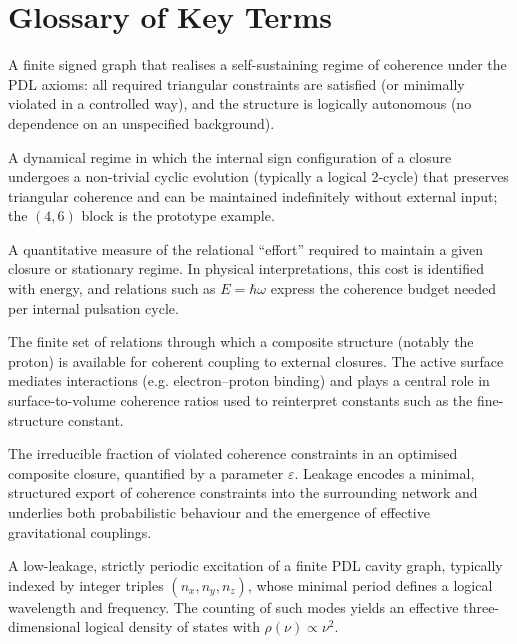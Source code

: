 \documentclass{article}
\begin{document}
\section{Glossary of Key Terms}
\label{app:key_glossary}

\begin{description}[style=nextline,leftmargin=1.5cm]

\item[Closure]
A finite signed graph that realises a self-sustaining regime of coherence under the PDL axioms: all required triangular constraints are satisfied (or minimally violated in a controlled way), and the structure is logically autonomous (no dependence on an unspecified background). 

\item[Logical stationary regime]
A dynamical regime in which the internal sign configuration of a closure undergoes a non-trivial cyclic evolution (typically a logical 2-cycle) that preserves triangular coherence and can be maintained indefinitely without external input; the $(4,6)$ block is the prototype example.

\item[Coherence cost]
A quantitative measure of the relational “effort” required to maintain a given closure or stationary regime. In physical interpretations, this cost is identified with energy, and relations such as \(E = \hbar \omega\) express the coherence budget needed per internal pulsation cycle.

\item[Active surface]
The finite set of relations through which a composite structure (notably the proton) is available for coherent coupling to external closures. The active surface mediates interactions (e.g. electron–proton binding) and plays a central role in surface-to-volume coherence ratios used to reinterpret constants such as the fine-structure constant.

\item[Leakage]
The irreducible fraction of violated coherence constraints in an optimised composite closure, quantified by a parameter \(\varepsilon\). Leakage encodes a minimal, structured export of coherence constraints into the surrounding network and underlies both probabilistic behaviour and the emergence of effective gravitational couplings.

\item[Cavity mode]
A low-leakage, strictly periodic excitation of a finite PDL cavity graph, typically indexed by integer triples \((n_x,n_y,n_z)\), whose minimal period defines a logical wavelength and frequency. The counting of such modes yields an effective three-dimensional logical density of states with \(\rho(\nu)\propto \nu^2\).

\end{description}




\end{document}
